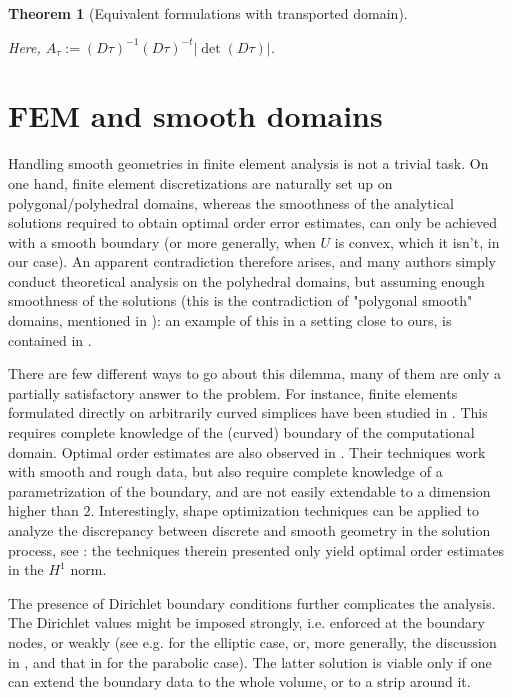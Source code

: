 \documentclass[english,a4paper,9pt,oneside]{scrbook}	%
\theoremstyle{break}
\newtheorem{thm}[equation]{Theorem}
\theoremstyle{remark}
\begin{document}
\begin{appendices}
\begin{thm}[Equivalent formulations with transported domain]
\begin{itemize}
\end{itemize}

Here, $A_\tau:=  (D\tau)^{-1}(D\tau)^{-t}|\det(D\tau)|$.

\end{thm}

\chapter{FEM and smooth domains}
\label{chap:inh_fem}
Handling smooth geometries in finite element analysis is not a trivial task. On one hand, finite element discretizations are naturally set up on polygonal/polyhedral domains, whereas the smoothness of the analytical solutions required to obtain optimal order error estimates, can only be achieved with a smooth boundary (or more generally, when $U$ is convex, which it isn't, in our case). An apparent contradiction therefore arises, and many authors simply conduct theoretical analysis on the polyhedral domains, but assuming enough smoothness of the solutions (this is the contradiction of "polygonal smooth" domains, mentioned in \cite{tiihonen}): an example of this in a setting close to ours, is contained in \cite{paganini}. 

There are few different ways to go about this dilemma, many of them are only a partially satisfactory answer to the problem. For instance, finite elements formulated directly on arbitrarily curved simplices have been studied in \cite{zlamal}. This requires complete knowledge of the (curved) boundary of the computational domain. Optimal order estimates are also observed in \cite{bramble}. Their techniques work with smooth and rough data, but also require complete knowledge of a parametrization of the boundary, and are not easily extendable to a dimension higher than $2$. Interestingly, shape optimization techniques can be applied to analyze the discrepancy between discrete and smooth geometry in the solution process, see \cite{tiihonen}: the techniques therein presented only yield optimal order estimates in the $H^1$ norm.

The presence of Dirichlet boundary conditions further complicates the analysis. The Dirichlet values might be imposed strongly, i.e. enforced at the boundary nodes, or weakly (see e.g. \cite{chiba} for the elliptic case, or, more generally, the discussion in \cite{chouly}, and that in \cite{benner} for the parabolic case). The latter solution is viable only if one can extend the boundary data to the whole volume, or to a strip around it.


\end{appendices}
\end{document}
